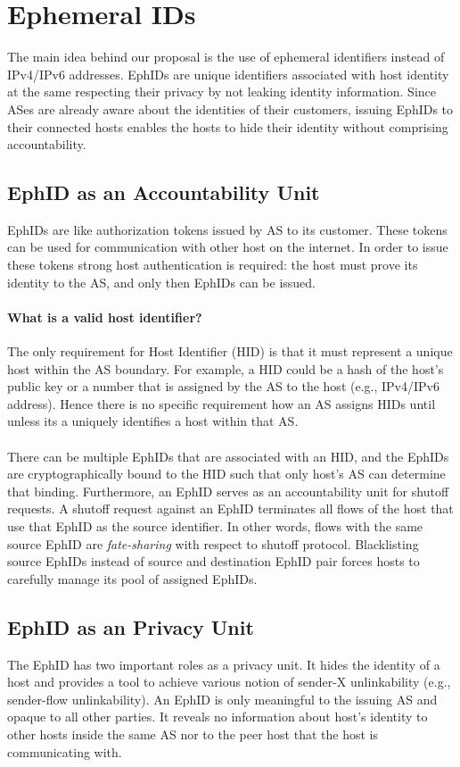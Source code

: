 \section{Ephemeral IDs} \label{sec:ephid}
The main idea behind our proposal is the use of ephemeral identifiers instead of IPv4/IPv6 addresses. EphIDs are unique identifiers associated with host identity at the same respecting their privacy by not leaking identity information. Since ASes are already aware about the identities of their customers, issuing EphIDs to their connected hosts enables the hosts to hide their identity without comprising accountability.

\subsection{EphID as an Accountability Unit}
EphIDs are like authorization tokens issued by AS to its customer. These tokens can be used for communication with other host on the internet. In order to issue these tokens strong host authentication is required: the host must prove its identity to the AS, and only then EphIDs can be issued.
\paragraph{What is a valid host identifier?} 
The only requirement for Host Identifier (HID) is that it must represent a unique host within the AS boundary. For example, a HID could be a hash of the host's public key or a number that is assigned by the AS to the host (e.g., IPv4/IPv6 address). Hence there is no specific requirement how an AS assigns HIDs until unless its a uniquely identifies a host within that AS.
\\ \\
There can be multiple EphIDs that are associated with an HID, and the EphIDs are cryptographically bound to the HID such that only host's AS can determine that binding. Furthermore, an EphID serves as an accountability unit for shutoff requests. A shutoff request against an EphID terminates all flows of the host that use that EphID as the source identifier. In other words, flows with the same source EphID are \textit{fate-sharing} with respect to shutoff protocol. Blacklisting source EphIDs instead of source and destination EphID pair forces hosts to carefully manage its pool of assigned EphIDs.

\subsection{EphID as an Privacy Unit}
The EphID has two important roles as a privacy unit. It hides the identity of a host and provides a tool to achieve various notion of sender-X unlinkability (e.g., sender-flow unlinkability). An EphID is only meaningful to the issuing AS and opaque to all other parties. It reveals no information about host's identity to other hosts inside the same AS nor to the peer host that the host is communicating with.

